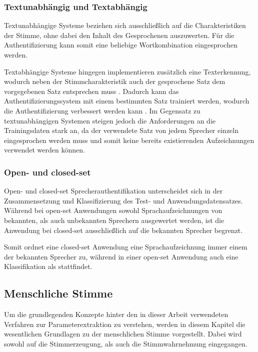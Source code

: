 \subsubsection{Textunabhängig und Textabhängig}

\textauthor{\vHS}{}{}

Textunabhängige Systeme beziehen sich ausschließlich auf die Charakteristiken der Stimme, ohne dabei den Inhalt des Gesprochenen auszuwerten.
Für die Authentifizierung kann somit eine beliebige Wortkombination eingesprochen werden.

Textabhängige Systeme hingegen implementieren zusätzlich eine Texterkennung, wodurch neben der Stimmcharakteristik auch der gesprochene Satz dem vorgegebenen Satz entsprechen muss \autocite[vgl.][S. 2]{thullier_text-independent_2017}.
Dadurch kann das Authentifizierungssystem mit einem bestimmten Satz trainiert werden, wodurch die Authentifizierung verbessert werden kann \autocite[vgl.][S.]{sidorov_text-independent_2010}.
Im Gegensatz zu textunabhängigen Systemen steigen jedoch die Anforderungen an die Trainingsdaten stark an, da der verwendete Satz von jedem Sprecher einzeln eingesprochen werden muss und somit keine bereits existierenden Aufzeichnungen verwendet werden können.

\subsubsection{Open- und closed-set}
Open- und closed-set Sprecherauthentifikation unterscheidet sich in der Zusammensetzung und Klassifizierung des Test- und Anwendungsdatensatzes.
Während bei open-set Anwendungen sowohl Sprachaufzeichnungen von bekannten, als auch unbekannten Sprechern ausgewertet werden, ist die Anwendung bei closed-set ausschließlich auf die bekannten Sprecher begrenzt.

Somit ordnet eine closed-set Anwendung eine Sprachaufzeichnung immer einem der bekannten Sprecher zu, während in einer open-set Anwendung auch eine Klassifikation als  stattfindet.

\subsection{Menschliche Stimme}
Um die grundlegenden Konzepte hinter den in dieser Arbeit verwendeten Verfahren zur Parameterextraktion zu verstehen, werden in diesem Kapitel die wesentlichen Grundlagen zu der menschlichen Stimme vorgestellt.
Dabei wird sowohl auf die Stimmerzeugung, als auch die Stimmwahrnehmung eingegangen.

